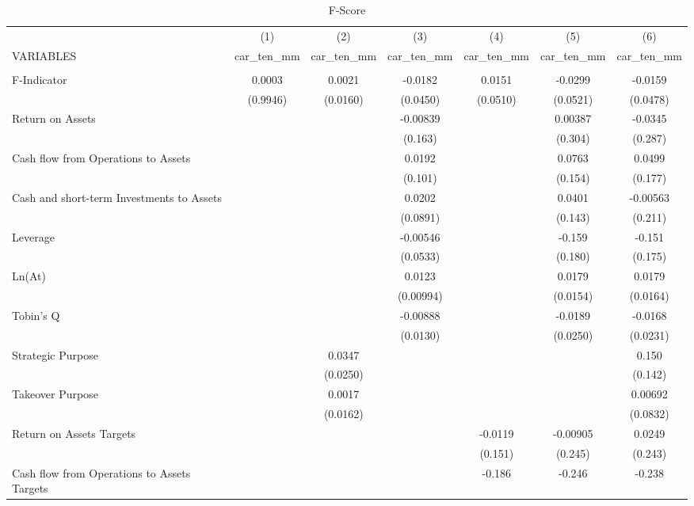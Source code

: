 \documentclass[12pt]{article}
\begin{document}
	\begin{table}[ht]
	\centering
	\caption{F-Score}

	\begin{adjustbox}{height=10cm, max width=\textwidth}
	\begin{tabular}{lcccccc} \hline
		& (1) & (2) & (3) & (4) & (5) & (6) \\
	   VARIABLES & car\_ten\_mm & car\_ten\_mm & car\_ten\_mm & car\_ten\_mm & car\_ten\_mm & car\_ten\_mm \\ \hline
		&  &  &  &  &  &  \\
	   F-Indicator & 0.0003 & 0.0021 & -0.0182 & 0.0151 & -0.0299 & -0.0159 \\
		& (0.9946) & (0.0160) & (0.0450) & (0.0510) & (0.0521) & (0.0478) \\
	   Return on Assets &  &  & -0.00839 &  & 0.00387 & -0.0345 \\
		&  &  & (0.163) &  & (0.304) & (0.287) \\
	   Cash flow from Operations to Assets &  &  & 0.0192 &  & 0.0763 & 0.0499 \\
		&  &  & (0.101) &  & (0.154) & (0.177) \\
	   Cash and short-term Investments to Assets &  &  & 0.0202 &  & 0.0401 & -0.00563 \\
		&  &  & (0.0891) &  & (0.143) & (0.211) \\
	   Leverage &  &  & -0.00546 &  & -0.159 & -0.151 \\
		&  &  & (0.0533) &  & (0.180) & (0.175) \\
	   Ln(At) &  &  & 0.0123 &  & 0.0179 & 0.0179 \\
		&  &  & (0.00994) &  & (0.0154) & (0.0164) \\
	   Tobin's Q &  &  & -0.00888 &  & -0.0189 & -0.0168 \\
		&  &  & (0.0130) &  & (0.0250) & (0.0231) \\
	   Strategic Purpose &  & 0.0347 &  &  &  & 0.150 \\
		&  & (0.0250) &  &  &  & (0.142) \\
	   Takeover Purpose &  & 0.0017 &  &  &  & 0.00692 \\
		&  & (0.0162) &  &  &  & (0.0832) \\
	   Return on Assets Targets &  &  &  & -0.0119 & -0.00905 & 0.0249 \\
		&  &  &  & (0.151) & (0.245) & (0.243) \\
	   Cash flow from Operations to Assets Targets &  &  &  & -0.186 & -0.246 & -0.238 \\

\end{tabular}
\end{adjustbox}
\end{table}
\end{document}
